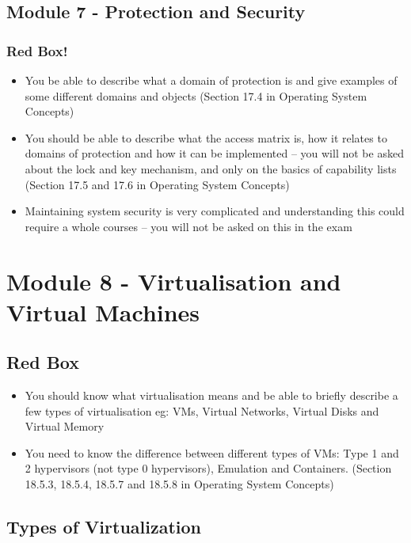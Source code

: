 \documentclass{article}
\begin{document}
\subsection{Module 7 - Protection and Security}
\subsubsection{Red Box!}
\begin{itemize}
    \item You be able to describe what a domain of protection is and give examples of some different domains and
    objects (Section 17.4 in Operating System Concepts)
    \item You should be able to describe what the access matrix is, how it relates to domains of protection and how it can be implemented – you will not be asked about
    the lock and key mechanism, and only on the basics of capability lists (Section 17.5 and 17.6 in Operating System Concepts)
    \item Maintaining system security is very complicated and understanding this could require a whole courses – you will
    not be asked on this in the exam
\end{itemize}



\section{Module 8 - Virtualisation and Virtual Machines}
\subsection{Red Box}
\begin{itemize}
    \item You should know what virtualisation means and be able to briefly describe a few types of virtualisation eg: VMs,
    Virtual Networks, Virtual Disks and Virtual Memory
    \item You need to know the difference between different types of VMs: Type 1 and 2 hypervisors (not type 0
    hypervisors), Emulation and Containers. (Section 18.5.3, 18.5.4, 18.5.7 and 18.5.8 in Operating System Concepts)
\end{itemize}

\subsection{Types of Virtualization}
\end{document}
